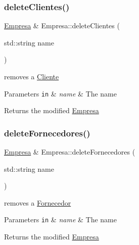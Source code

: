 \subsubsection{\texorpdfstring{delete\+Clientes()}{deleteClientes()}}
{\footnotesize\ttfamily \hyperlink{classEmpresa}{Empresa} \& Empresa\+::delete\+Clientes (\begin{DoxyParamCaption}\item[{std\+::string}]{name }\end{DoxyParamCaption})}



removes a \hyperlink{classCliente}{Cliente} 


\begin{DoxyParams}[1]{Parameters}
\mbox{\tt in}  & {\em name} & The name\\
\hline
\end{DoxyParams}
\begin{DoxyReturn}{Returns}
the modified \hyperlink{classEmpresa}{Empresa} 
\end{DoxyReturn}
\mbox{\label{classEmpresa_ab8b7dda77caceec58e464c16b7e45f7c}} 
\subsubsection{\texorpdfstring{delete\+Fornecedores()}{deleteFornecedores()}}
{\footnotesize\ttfamily \hyperlink{classEmpresa}{Empresa} \& Empresa\+::delete\+Fornecedores (\begin{DoxyParamCaption}\item[{std\+::string}]{name }\end{DoxyParamCaption})}



removes a \hyperlink{classFornecedor}{Fornecedor} 


\begin{DoxyParams}[1]{Parameters}
\mbox{\tt in}  & {\em name} & The name\\
\hline
\end{DoxyParams}
\begin{DoxyReturn}{Returns}
the modified \hyperlink{classEmpresa}{Empresa} 
\end{DoxyReturn}
\mbox{\label{classEmpresa_a079c008b006f56faac3c1016fe770e8c}} 
